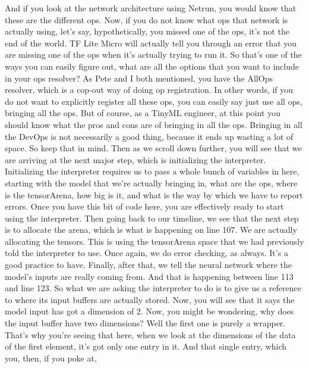     And if you look at the network architecture using Netrun,
    you would know that these are the different ops.
    Now, if you do not know what ops that network is actually using,
    let's say, hypothetically, you missed one of the ops,
    it's not the end of the world.
    TF Lite Micro will actually tell you through an error
    that you are missing one of the ops when it's actually trying to run it.
    So that's one of the ways you can easily figure out,
    what are all the options that you want to include in your ops resolver?
    As Pete and I both mentioned, you have the AllOps resolver,
    which is a cop-out way of doing op registration.
    In other words, if you do not want to explicitly register all these ops,
    you can easily say just use all ops, bringing all the ops.
    But of course, as a TinyML engineer, at this point
    you should know what the pros and cons are of bringing in all the ops.
    Bringing in all the DevOps is not necessarily a good thing,
    because it ends up wasting a lot of space.
    So keep that in mind.
    Then as we scroll down further, you will see
    that we are arriving at the next major step, which
    is initializing the interpreter.
    Initializing the interpreter requires us to pass a whole bunch of variables
    in here, starting with the model that we're actually bringing in,
    what are the ops, where is the tensorArena, how big is it,
    and what is the way by which we have to report errors.
    Once you have this bit of code here, you are effectively
    ready to start using the interpreter.
    Then going back to our timeline, we see that the next step
    is to allocate the arena, which is what is happening on line 107.
    We are actually allocating the tensors.
    This is using the tensorArena space that we had previously
    told the interpreter to use.
    Once again, we do error checking, as always.
    It's a good practice to have.
    Finally, after that, we tell the neural network
    where the model's inputs are really coming from.
    And that is happening between line 113 and line 123.
    So what we are asking the interpreter to do
    is to give us a reference to where its input buffers are actually stored.
    Now, you will see that it says the model input has got a dimension of 2.
    Now, you might be wondering, why does the input buffer have two dimensions?
    Well the first one is purely a wrapper.
    That's why you're seeing that here, when we
    look at the dimensions of the data of the first element,
    it's got only one entry in it.
    And that single entry, which you, then, if you poke at,
